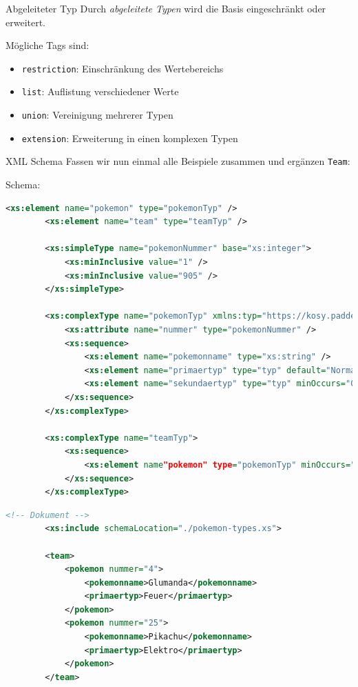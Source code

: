 \begin{bonus}{Abgeleiteter Typ}
    Durch \emph{abgeleitete Typen} wird die Basis eingeschränkt oder erweitert.
    
    Mögliche Tags sind:
    
    \begin{itemize}
        \item \texttt{restriction}: Einschränkung des Wertebereichs
        \item \texttt{list}: Auflistung verschiedener Werte
        \item \texttt{union}: Vereinigung mehrerer Typen
        \item \texttt{extension}: Erweiterung in einen komplexen Typen
    \end{itemize}
\end{bonus}

\begin{example}{XML Schema}
    Fassen wir nun einmal alle Beispiele zusammen und ergänzen \texttt{Team}:
    
    Schema:
    \begin{lstlisting}[language=XML]
        <xs:element name="pokemon" type="pokemonTyp" />
        <xs:element name="team" type="teamTyp" />

        <xs:simpleType name="pokemonNummer" base="xs:integer">
            <xs:minInclusive value="1" />
            <xs:minInclusive value="905" />
        </xs:simpleType>

        <xs:complexType name="pokemonTyp" xmlns:typ="https://kosy.paddel.xyz/typ">
            <xs:attribute name="nummer" type="pokemonNummer" />
            <xs:sequence>
                <xs:element name="pokemonname" type="xs:string" />
                <xs:element name="primaertyp" type="typ" default="Normal" />
                <xs:element name="sekundaertyp" type="typ" minOccurs="0" />
            </xs:sequence>
        </xs:complexType>

        <xs:complexType name="teamTyp">
            <xs:sequence>
                <xs:element name"pokemon" type="pokemonTyp" minOccurs="0" maxOccurs="6" />
            </xs:sequence>
        </xs:complexType>
    \end{lstlisting}
    
    \begin{lstlisting}[language=XML]
        <!-- Dokument -->
        <xs:include schemaLocation="./pokemon-types.xs">

        <team>
            <pokemon nummer="4">
                <pokemonname>Glumanda</pokemonname>
                <primaertyp>Feuer</primaertyp>
            </pokemon>
            <pokemon nummer="25">
                <pokemonname>Pikachu</pokemonname>
                <primaertyp>Elektro</primaertyp>
            </pokemon>
        </team>
    \end{lstlisting}
\end{example}

